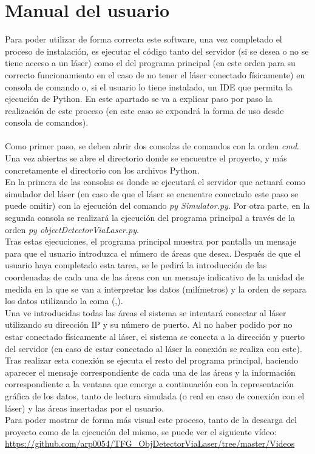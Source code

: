 \section{Manual del usuario}
Para poder utilizar de forma correcta este software, una vez completado el proceso de instalación, es ejecutar el código tanto del servidor (si se desea o no se tiene acceso a un láser) como el del programa principal (en este orden para su correcto funcionamiento en el caso de no tener el láser conectado físicamente) en consola de comando o, si el usuario lo tiene instalado, un IDE que permita la ejecución de Python. En este apartado se va a explicar paso por paso la realización de este proceso (en este caso se expondrá la forma de uso desde consola de comandos).\\
\\
Como primer paso, se deben abrir dos consolas de comandos con la orden \textit{cmd}. Una vez abiertas se abre el directorio donde se encuentre el proyecto, y más concretamente el directorio con los archivos Python.\\
En la primera de las consolas es donde se ejecutará el servidor que actuará como simulador del láser (en caso de que el láser se encuentre conectado este paso se puede omitir) con la ejecución del comando \textit{py Simulator.py}. Por otra parte, en la segunda consola se realizará la ejecución del programa principal a través de la orden \textit{py objectDetectorViaLaser.py}.\\
Tras estas ejecuciones, el programa principal muestra por pantalla un mensaje para que el usuario introduzca el número de áreas que desea. Después de  que el usuario haya completado esta tarea, se le pedirá la introducción de las coordenadas de cada una de las áreas con un mensaje indicativo de la unidad de medida en la que se van a interpretar los datos (milímetros) y la orden de separa los datos utilizando la coma (,).\\
Una ve introducidas todas las áreas el sistema se intentará conectar al láser utilizando su dirección IP y su número de puerto. Al no haber podido por no estar conectado físicamente al láser, el sistema se conecta a la dirección y puerto del servidor (en caso de estar conectado al láser la conexión se realiza con este). Tras realizar esta conexión se ejecuta el resto del programa principal, haciendo aparecer el mensaje correspondiente de cada una de las áreas y la información correspondiente a la ventana que emerge a continuación con la representación gráfica de los datos, tanto de lectura simulada (o real en caso de conexión con el láser) y las áreas insertadas por el usuario.\\
Para poder mostrar de forma más visual este proceso, tanto de la descarga del proyecto como de la ejecución del mismo, se puede ver el siguiente vídeo: \url{https://github.com/arp0054/TFG_ObjDetectorViaLaser/tree/master/Videos}
